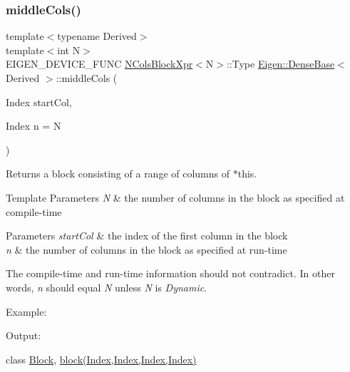 \subsubsection{\texorpdfstring{middleCols()}{middleCols()}\hspace{0.1cm}{\footnotesize\ttfamily [2/2]}}
{\footnotesize\ttfamily template$<$typename Derived$>$ \\
template$<$int N$>$ \\
E\+I\+G\+E\+N\+\_\+\+D\+E\+V\+I\+C\+E\+\_\+\+F\+U\+NC \mbox{\hyperlink{struct_eigen_1_1_dense_base_1_1_n_cols_block_xpr}{N\+Cols\+Block\+Xpr}}$<$N$>$\+::Type \mbox{\hyperlink{class_eigen_1_1_dense_base}{Eigen\+::\+Dense\+Base}}$<$ Derived $>$\+::middle\+Cols (\begin{DoxyParamCaption}\item[{Index}]{start\+Col,  }\item[{Index}]{n = {\ttfamily N} }\end{DoxyParamCaption})\hspace{0.3cm}{\ttfamily [inline]}}

\begin{DoxyReturn}{Returns}
a block consisting of a range of columns of $\ast$this.
\end{DoxyReturn}

\begin{DoxyTemplParams}{Template Parameters}
{\em N} & the number of columns in the block as specified at compile-\/time \\
\hline
\end{DoxyTemplParams}

\begin{DoxyParams}{Parameters}
{\em start\+Col} & the index of the first column in the block \\
\hline
{\em n} & the number of columns in the block as specified at run-\/time\\
\hline
\end{DoxyParams}
The compile-\/time and run-\/time information should not contradict. In other words, {\itshape n} should equal {\itshape N} unless {\itshape N} is {\itshape Dynamic}.

Example\+: 
\begin{DoxyCodeInclude}{0}
\end{DoxyCodeInclude}
 Output\+: 
\begin{DoxyVerbInclude}
\end{DoxyVerbInclude}
 class \mbox{\hyperlink{class_eigen_1_1_block}{Block}}, \mbox{\hyperlink{class_eigen_1_1_dense_base_ab8e42e67c5cfd5fa13e684642f0f65bf}{block(\+Index,\+Index,\+Index,\+Index)}} \mbox{\label{class_eigen_1_1_dense_base_a604b8a3100dd565b536720c2df24e10f}} 
